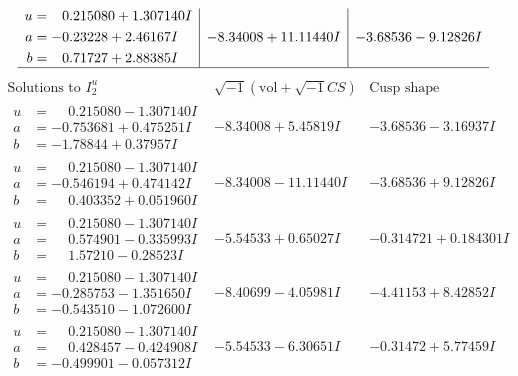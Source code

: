 \documentclass[1p]{elsarticle_modified}
\theoremstyle{definition}
\newcommand{\I}{\sqrt{-1}}
\begin{document}
$$\begin{array}{c|c|c}
\begin{aligned}
u &= \phantom{-}0.215080 + 1.307140 I \\
a &= -0.23228 + 2.46167 I \\
b &= \phantom{-}0.71727 + 2.88385 I\end{aligned}
 & -8.34008 + 11.11440 I & -3.68536 - 9.12826 I\\
 \hline 
 \end{array}$$\newpage$$\begin{array}{c|c|c}  
\text{Solutions to }I^u_{2}& \I (\text{vol} + \sqrt{-1}CS) & \text{Cusp shape}\\
 \hline 
\begin{aligned}
u &= \phantom{-}0.215080 - 1.307140 I \\
a &= -0.753681 + 0.475251 I \\
b &= -1.78844 + 0.37957 I\end{aligned}
 & -8.34008 + 5.45819 I & -3.68536 - 3.16937 I \\ \hline\begin{aligned}
u &= \phantom{-}0.215080 - 1.307140 I \\
a &= -0.546194 + 0.474142 I \\
b &= \phantom{-}0.403352 + 0.051960 I\end{aligned}
 & -8.34008 - 11.11440 I & -3.68536 + 9.12826 I \\ \hline\begin{aligned}
u &= \phantom{-}0.215080 - 1.307140 I \\
a &= \phantom{-}0.574901 - 0.335993 I \\
b &= \phantom{-}1.57210 - 0.28523 I\end{aligned}
 & -5.54533 + 0.65027 I & -0.314721 + 0.184301 I \\ \hline\begin{aligned}
u &= \phantom{-}0.215080 - 1.307140 I \\
a &= -0.285753 - 1.351650 I \\
b &= -0.543510 - 1.072600 I\end{aligned}
 & -8.40699 - 4.05981 I & -4.41153 + 8.42852 I \\ \hline\begin{aligned}
u &= \phantom{-}0.215080 - 1.307140 I \\
a &= \phantom{-}0.428457 - 0.424908 I \\
b &= -0.499901 - 0.057312 I\end{aligned}
 & -5.54533 - 6.30651 I & -0.31472 + 5.77459 I \\ \hline\begin{aligned}

\end{aligned}
\end{array}$$
\end{document}
